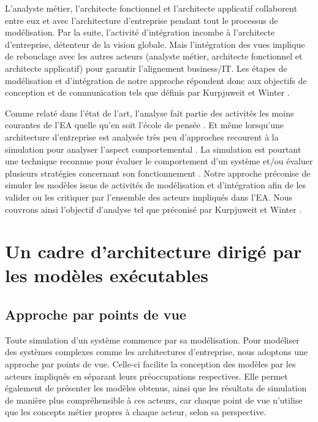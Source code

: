 {L'analyste métier, l'architecte fonctionnel et l'architecte applicatif 
collaborent entre eux et avec l'architecture d'entreprise pendant tout le 
processus de modélisation. Par la suite, l'activité d'intégration incombe à 
l'architecte d'entreprise, détenteur de la vision globale. Mais l'intégration 
des vues implique de rebouclage avec les autres acteurs (analyste métier, 
architecte fonctionnel et architecte applicatif) pour garantir l'alignement 
business/IT. Les étapes de modélisation et d'intégration de notre approche 
répondent donc aux objectifs de conception et de communication tels que définis 
par Kurpjuweit et Winter \cite{kurpjuweit2007viewpoint}.

Comme relaté dans l'état de l'art, l'analyse fait partie des activités les moins 
courantes de l'EA quelle qu'en soit l'école de pensée 
\cite{chen2008architectures} \cite{barn2013enterprise}. Et même lorsqu'une 
architecture d'entreprise est analysée très peu d'approches recourent à la 
simulation pour analyser l'aspect comportemental \cite{glazner2011enterprise} 
\cite{manzur2015xarchimate}. La simulation est pourtant une technique reconnue 
pour évaluer le comportement d'un système et/ou évaluer plusieurs stratégies 
concernant son fonctionnement \cite{shannon1975systems}. Notre approche 
préconise de simuler les modèles issus de activités de modélisation et 
d'intégration afin de les valider ou les critiquer par l'ensemble des acteurs 
impliqués dans l'EA. Nous couvrons ainsi l'objectif d'analyse tel que préconisé 
par Kurpjuweit et Winter \cite{kurpjuweit2007viewpoint}. 



\section{Un cadre d'architecture dirigé par les modèles exécutables}

\subsection{Approche par points de vue}

Toute simulation d'un système commence par sa modélisation. Pour modéliser des 
systèmes complexes comme les architectures d'entreprise, nous adoptons une 
approche par points de vue. Celle-ci facilite la conception des modèles par les 
acteurs impliqués en séparant leurs préoccupations respectives. Elle permet 
également de présenter les modèles obtenus, ainsi que les résultats de 
simulation de manière plus compréhensible à ces acteurs, car chaque point de vue 
n'utilise que les concepts métier propres à chaque acteur, selon sa perspective. 

}
